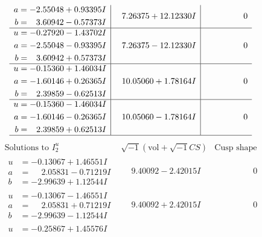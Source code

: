 \documentclass[1p]{elsarticle_modified}
\theoremstyle{definition}
\newcommand{\I}{\sqrt{-1}}
\begin{document}
$$\begin{array}{c|c|c}
\begin{aligned}
a &= -2.55048 + 0.93395 I \\
b &= \phantom{-}3.60942 - 0.57373 I\end{aligned}
 & \phantom{-}7.26375 + 12.12330 I & \phantom{-0.000000 } 0 \\ \hline\begin{aligned}
u &= -0.27920 - 1.43702 I \\
a &= -2.55048 - 0.93395 I \\
b &= \phantom{-}3.60942 + 0.57373 I\end{aligned}
 & \phantom{-}7.26375 - 12.12330 I & \phantom{-0.000000 } 0 \\ \hline\begin{aligned}
u &= -0.15360 + 1.46034 I \\
a &= -1.60146 + 0.26365 I \\
b &= \phantom{-}2.39859 - 0.62513 I\end{aligned}
 & \phantom{-}10.05060 + 1.78164 I & \phantom{-0.000000 } 0 \\ \hline\begin{aligned}
u &= -0.15360 - 1.46034 I \\
a &= -1.60146 - 0.26365 I \\
b &= \phantom{-}2.39859 + 0.62513 I\end{aligned}
 & \phantom{-}10.05060 - 1.78164 I & \phantom{-0.000000 } 0\\
 \hline 
 \end{array}$$\newpage$$\begin{array}{c|c|c}  
\text{Solutions to }I^u_{2}& \I (\text{vol} + \sqrt{-1}CS) & \text{Cusp shape}\\
 \hline 
\begin{aligned}
u &= -0.13067 + 1.46551 I \\
a &= \phantom{-}2.05831 - 0.71219 I \\
b &= -2.99639 + 1.12544 I\end{aligned}
 & \phantom{-}9.40092 - 2.42015 I & \phantom{-0.000000 } 0 \\ \hline\begin{aligned}
u &= -0.13067 - 1.46551 I \\
a &= \phantom{-}2.05831 + 0.71219 I \\
b &= -2.99639 - 1.12544 I\end{aligned}
 & \phantom{-}9.40092 + 2.42015 I & \phantom{-0.000000 } 0 \\ \hline\begin{aligned}
u &= -0.25867 + 1.45576 I \\

\end{aligned}
\end{array}$$
\end{document}
